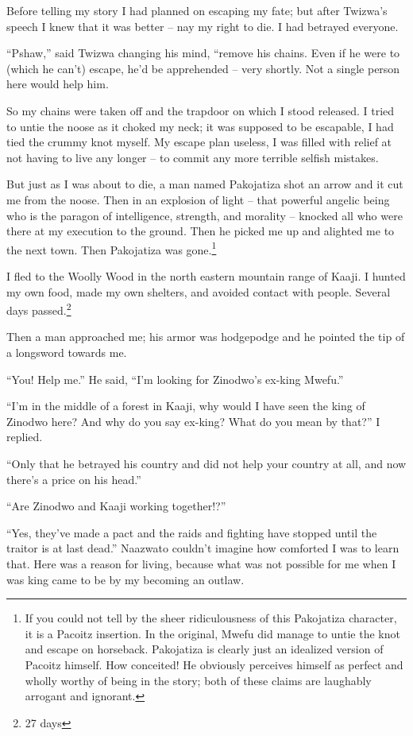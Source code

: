 Before telling my story I had planned on escaping my fate; but after Twizwa's speech I knew that it was better -- nay my right to die. I had betrayed everyone.

``Pshaw,'' said Twizwa changing his mind, ``remove his chains. Even if he were to (which he can't) escape, he'd be apprehended -- very shortly. Not a single person here would help him.

So my chains were taken off and the trapdoor on which I stood released. I tried to untie the noose as it choked my neck; it was supposed to be escapable, I had tied the crummy knot myself. My escape plan useless, I was filled with relief at not having to live any longer -- to commit any more terrible selfish mistakes.

But just as I was about to die, a man named Pakojatiza shot an arrow and it cut me from the noose. Then in an explosion of light -- that powerful angelic being who is the paragon of intelligence, strength, and morality -- knocked all who were there at my execution to the ground. Then he picked me up and alighted me to the next town. Then Pakojatiza was gone.\footnote{If you could not tell by the sheer ridiculousness of this Pakojatiza character, it is a Pacoitz insertion. In the original, Mwefu did manage to untie the knot and escape on horseback. Pakojatiza is clearly just an idealized version of Pacoitz himself. How conceited! He obviously perceives himself as perfect and wholly worthy of being in the story; both of these claims are laughably arrogant and ignorant.}

I fled to the Woolly Wood in the north eastern mountain range of Kaaji. I hunted my own food, made my own shelters, and avoided contact with people. Several days passed.\footnote{27 days}

\tbreak

Then a man approached me; his armor was hodgepodge and he pointed the tip of a longsword towards me.

``You! Help me.'' He said, ``I'm looking for Zinodwo's ex-king Mwefu.''

``I'm in the middle of a forest in Kaaji, why would I have seen the king of Zinodwo here? And why do you say ex-king? What do you mean by that?'' I replied.

``Only that he betrayed his country and did not help your country at all, and now there's a price on his head.''

``Are Zinodwo and Kaaji working together!?''

``Yes, they've made a pact and the raids and fighting have stopped until the traitor is at last dead.'' Naazwato couldn't imagine how comforted I was to learn that. Here was a reason for living, because what was not possible for me when I was king came to be by my becoming an outlaw. 

